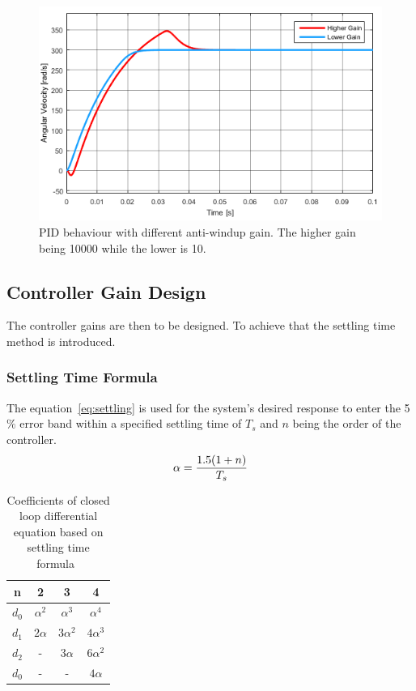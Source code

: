 \begin{figure}[!h]
	\centering
	\includegraphics[width=.6\linewidth]{graphics/pidwindupvaluecomp}
	\caption{PID behaviour with different anti-windup gain. The higher gain being 10000 while the lower is 10.}
	\label{fig:pidwindupvaluecomp}
\end{figure}

\subsection{Controller Gain Design}
The controller gains are then to be designed. To achieve that the settling time method is introduced.


\subsubsection{Settling Time Formula}

The equation~\ref{eq:settling} is used for the system's desired response to enter the 5$\%$ error band within a specified settling time of $T_s$ and $n$ being the order of the controller.
\begin{equation}
\centering
\label{eq:settling}
\alpha = \dfrac{1.5(1 + n)}{T_s}
\end{equation}

\begin{table}[!h]
	\caption{ Coefficients of
		closed loop differential
		equation based on settling
		time formula~\cite{feedback}}
	\centering
	\begin{tabular}{|c|c|c|c|}
		\hline
		n & 2 & 3 & 4\\
		\hline
		$d_0$ & $\alpha^2$ & $\alpha^3$ & $\alpha^4$\\ 
		$d_1$ & $2\alpha$ & $3\alpha^2$ & $4\alpha^3$\\
		$d_2$ & - & $3\alpha$ & $6\alpha^2$\\
		$d_0$ & - & - & $4\alpha$\\
		\hline	
		
	\end{tabular}
	\label{table:coefsettlingtime}
\end{table}


